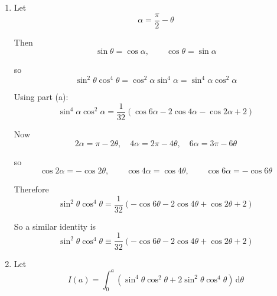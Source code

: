 \documentclass[leqno]{article}
\begin{document}
\begin{enumerate}[
  label=\textbf{\arabic*.},
  leftmargin=*,
  topsep=0pt,
  partopsep=0pt,
  parsep=0pt
]
\begin{djsSolution}
\begin{enumerate}[label=\textbf{(\alph*)}]
Now use de Moivre's theorem.

From
\[
(\cos 2\theta+i\sin 2\theta)^2=\cos 4\theta+i\sin 4\theta
\]

equating real parts gives
\[
\cos 4\theta=2\cos^2 2\theta-1=2c^2-1
\]

so
\[
c^2=\frac{1+\cos 4\theta}{2}
\]

Also, from
\[
(\cos 2\theta+i\sin 2\theta)^3=\cos 6\theta+i\sin 6\theta
\]

equating real parts gives
\[
\cos 6\theta=4\cos^3 2\theta-3\cos 2\theta=4c^3-3c
\]

so
\[
c^3=\frac{\cos 6\theta+3c}{4}
\]

Substituting these into \(\frac18(1-c-c^2+c^3)\):
\begin{align*}
\sin^4\theta\cos^2\theta
&=\frac18\left(1-c-\frac{1+\cos 4\theta}{2}+\frac{\cos 6\theta+3c}{4}\right) \\
&=\frac18\left(\frac{4-4c-2-2\cos 4\theta+\cos 6\theta+3c}{4}\right) \\
&=\frac{1}{32}\left(2-c-2\cos 4\theta+\cos 6\theta\right)
\end{align*}

Since \(c=\cos 2\theta\), this is
\[
\sin^4\theta\cos^2\theta\equiv \frac{1}{32}\left(\cos 6\theta-2\cos 4\theta-\cos 2\theta+2\right)
\]

as required.

\item Let
\[
\alpha=\frac{\pi}{2}-\theta
\]

Then
\[
\sin\theta=\cos\alpha,
\qquad
\cos\theta=\sin\alpha
\]

so
\[
\sin^2\theta\cos^4\theta=\cos^2\alpha\sin^4\alpha=\sin^4\alpha\cos^2\alpha
\]

Using part (a):
\[
\sin^4\alpha\cos^2\alpha=\frac{1}{32}\left(\cos 6\alpha-2\cos 4\alpha-\cos 2\alpha+2\right)
\]

Now
\[
2\alpha=\pi-2\theta,\quad 4\alpha=2\pi-4\theta,\quad 6\alpha=3\pi-6\theta
\]

so
\[
\cos 2\alpha=-\cos 2\theta,\qquad \cos 4\alpha=\cos 4\theta,\qquad \cos 6\alpha=-\cos 6\theta
\]

Therefore
\[
\sin^2\theta\cos^4\theta
=\frac{1}{32}\left(-\cos 6\theta-2\cos 4\theta+\cos 2\theta+2\right)
\]

So a similar identity is
\[
\sin^2\theta\cos^4\theta\equiv \frac{1}{32}\left(-\cos 6\theta-2\cos 4\theta+\cos 2\theta+2\right)
\]

\item Let
\[
I(a)=\int_0^a\left(\sin^4\theta\cos^2\theta+2\sin^2\theta\cos^4\theta\right)\,\mathrm{d}\theta
\]


\end{enumerate}
\end{djsSolution}
\end{enumerate}
\end{document}
